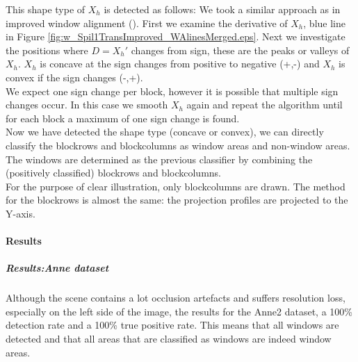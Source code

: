 This shape type of $X_h$ is detected as follows:
We took a similar approach as in improved window alignment (). First we examine the derivative of $X_h$, blue line in Figure
\ref{fig:w_Spil1TransImproved_WAlinesMerged.eps}.  Next we investigate the positions
where $D=X_{h}'$ changes from sign, these are the peaks or valleys of $X_h$.
$X_h$ is concave at the sign changes from positive to negative (+,-) and $X_h$
is convex if the sign changes (-,+).\\

We expect one sign change per block, however it is possible that multiple sign
changes occur. In this case we smooth $X_h$ again and repeat the algorithm
until for each block a maximum of one sign change is found. \\

Now we have detected the shape type (concave or convex), we can directly
classify the blockrows and blockcolumns as window areas and non-window areas.
The windows are determined as the previous classifier by combining the
(positively classified) blockrows and blockcolumns.\\

For the purpose of clear illustration, only blockcolumns are drawn. The method for
the blockrows is almost the same: the projection profiles are projected to the
Y-axis.

\newpage
\paragraph{Results} %

\subparagraph{Results:Anne dataset}

Although the scene contains a lot occlusion artefacts and suffers resolution
loss, especially on the left side of the image, the results for the Anne2
dataset, a 100\% detection rate and a 100\% true positive rate. This means that 
all windows are detected and that all areas that are classified as windows are
indeed window areas.\\
\clearpage


